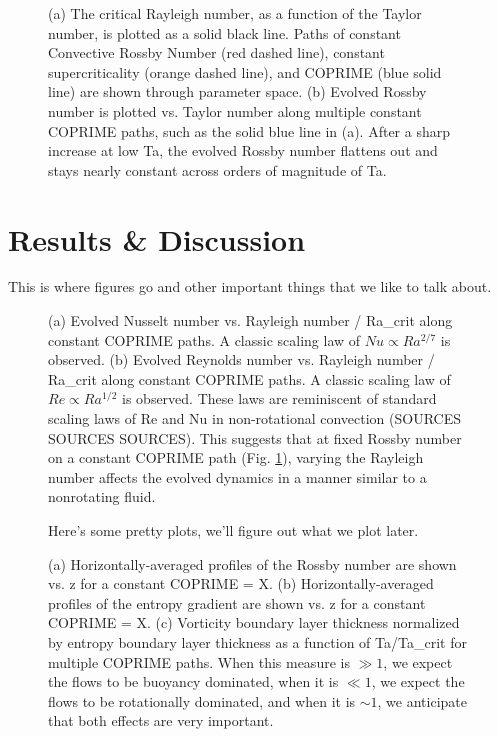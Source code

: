 \documentclass[twocolumn, amsmath, amsfonts, amssymb]{aastex62}
\begin{document}
\begin{figure}[h]
\caption{(a) The critical Rayleigh number, as a function of the Taylor number, 
is plotted as a solid black line. Paths of constant Convective Rossby Number
(red dashed line), constant supercriticality (orange dashed line), and 
COPRIME (blue solid line) are shown through parameter space. (b) Evolved
Rossby number is plotted vs. Taylor number along multiple constant COPRIME
paths, such as the solid blue line in (a). 
After a sharp increase at low Ta, the evolved Rossby number flattens
out and stays nearly constant across orders of magnitude of Ta.
\label{fig:parameter_space} }
\end{figure}



\section{Results \& Discussion}
\label{sec:results}
This is where figures go and other important things that we like to talk about.


\begin{figure}[h]
\caption{(a) Evolved Nusselt number vs. Rayleigh number / Ra\_crit along constant
COPRIME paths. A classic scaling law of $Nu \propto Ra^{2/7}$ is observed.
(b) Evolved Reynolds number vs. Rayleigh number / Ra\_crit along constant COPRIME paths.
A classic scaling law of $Re \propto Ra^{1/2}$ is observed. These laws are
reminiscent of standard scaling laws of Re and Nu in non-rotational convection
(SOURCES SOURCES SOURCES). This suggests that at fixed Rossby number on
a constant COPRIME path (Fig. \ref{fig:parameter_space}), varying the Rayleigh
number affects the evolved dynamics in a manner similar to a nonrotating fluid.
\label{fig:nu_and_re} }
\end{figure}

\begin{figure}[h]
\caption{ Here's some pretty plots, we'll figure out what we plot later.
\label{fig:pretty_convection} }
\end{figure}

\begin{figure}[h]
\caption{(a) Horizontally-averaged profiles of the Rossby number are shown
vs. z for a constant COPRIME = X. (b) Horizontally-averaged profiles of 
the entropy gradient are shown vs. z for a constant COPRIME = X.
(c) Vorticity boundary layer thickness normalized by entropy boundary layer
thickness as a function of Ta/Ta\_crit for multiple COPRIME paths.
When this measure is $\gg 1$, we expect the flows to be buoyancy dominated,
when it is $\ll 1$, we expect the flows to be rotationally dominated,
and when it is $\sim 1$, we anticipate that both effects are very important.
\label{fig:profiles_and_bls} }
\end{figure}
\end{document}
